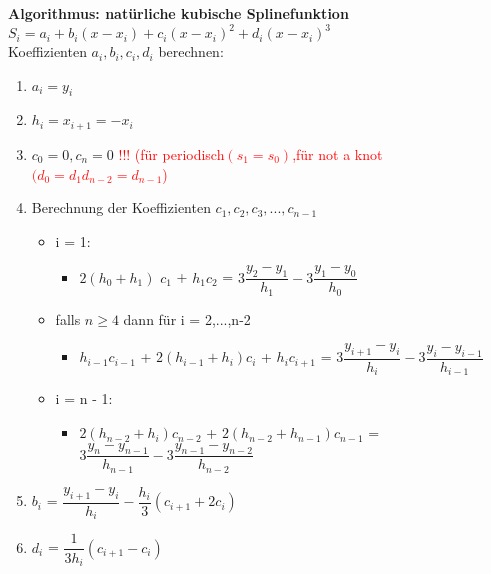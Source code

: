 \documentclass[../ZF_HM2.tex]{subfiles}
\begin{document}
\begin{mdframed}
	\textbf{Algorithmus: natürliche kubische Splinefunktion\\}
	$S_i = a_i + b_i(x-x_i) + c_i(x-x_i)^{2} + d_i(x-x_i)^{3}$\\
Koeffizienten $a_i,b_i,c_i,d_i$ berechnen:
\begin{enumerate}
	\item $a_i = y_i$
	\item $h_i = x_{i+1} = -x_i$
	\item $c_0 = 0, c_n=0$ \textcolor{red}{!!! (für periodisch$(s_1 = s_0)$,für not a knot$(d_0 = d_1 d_{n-2} = d_{n-1}$)}
	\item Berechnung der Koeffizienten $c_1,c_2,c_3,...,c_{n-1}$
	\begin{itemize}
		\item \colorbox {green!30} {i = 1:}
		\begin{itemize}
			\item \colorbox{yellow!30}{$2(h_0 + h_1)$} \colorbox {violet!30}{$c_1$} + \colorbox{yellow!30}{$h_1$}\colorbox {violet!30}{$c_2$} = \colorbox{orange!30}{$3\dfrac{y_2-y_1}{h_1}-3\dfrac{y_1-y_0}{h_0}$}
		\end{itemize}
		\item falls \colorbox {green!30} {$n \geq 4$} dann für i = 2,...,n-2
		\begin{itemize}
			\item \colorbox{yellow!30}{$h_{i-1}$}\colorbox {violet!30}{$c_{i-1}$} + \colorbox{yellow!30}{$2(h_{i-1} + h_i)$}\colorbox {violet!30}{$c_{i}$} + \colorbox{yellow!30}{$h_i$}\colorbox {violet!30}{$c_{i+1}$} = \colorbox{orange!30}{$3\dfrac{y_{i+1}-y_i}{h_i}-3\dfrac{y_i-y_{i-1}}{h_{i-1}}$}
		\end{itemize}
		\item \colorbox {green!30} {i = n - 1:}
		\begin{itemize}
			\item \colorbox{yellow!30}{$2(h_{n-2} + h_i)$}\colorbox {violet!30}{$c_{n-2}$} + \colorbox{yellow!30}{$2(h_{n-2} + h_{n-1})$}\colorbox {violet!30}{$c_{n-1}$} = \colorbox{orange!30}{$3\dfrac{y_{n}-y_{n-1}}{h_{n-1}}-3\dfrac{y_{n-1}-y_{n-2}}{h_{n-2}}$}
		\end{itemize}
		
	\end{itemize}
	\item $b_i$ = $\dfrac{y_{i+1}-y_{i}}{h_{i}}-\dfrac{h_{i}}{3}(c_{i+1}+2c_i)$
	\item $d_i$ = $\dfrac{1}{3h_i}(c_{i+1}-c_i)$
\end{enumerate}
	
\end{mdframed}
\end{document}
